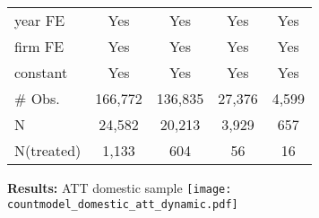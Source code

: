 \documentclass{beamer} %
\newcommand{\backupend}{
	\setcounter{framenumber}{\value{finalframe}}
}
\begin{document}
\begin{frame}[plain, label=dynamic]
\begin{table}[p!]
{\begin{tabular}{lcccc}
			\midrule
			year FE & Yes   & Yes   & Yes   & Yes \\
			firm FE & Yes   & Yes   & Yes   & Yes \\
			constant & Yes   & Yes   & Yes   & Yes \\
			\midrule
			\# Obs. & 166,772 & 136,835 & 27,376 & 4,599 \\
			N     & 24,582 & 20,213 & 3,929 & 657 \\
			N(treated) & 1,133 & 604   & 56    & 16 \\
			\midrule
		\end{tabular}%
		\label{tab:did_dynamic}%
		}
	\end{table}%
\end{frame}

\begin{frame}[label=domestic]{\textbf{Results:} ATT domestic sample}
		\centering\texttt{[image: countmodel\_domestic\_att\_dynamic.pdf]}
\end{frame}

\backupend
\end{document}

